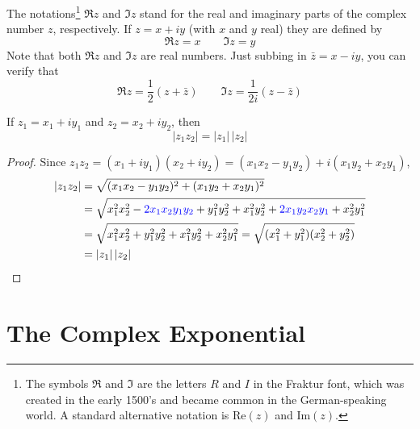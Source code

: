 \begin{defn}\label{def Re Im}
The notations\footnote{The symbols $\Re$ and $\Im$ are the letters $R$ and $I$
in the Fraktur font, which was created in the early 1500's and became common in the German-speaking world. A standard alternative notation is $\text{Re}(z)$ 
and $\text{Im}(z)$.} $\Re z$ and $\Im z$ stand for the real and imaginary parts 
of the complex number $z$, respectively. If $z=x+ iy$ (with $x$ and $y$ real) 
they are defined by 
\begin{equation*}
\Re z=x\qquad \Im z=y
\end{equation*}
Note that both $\Re z$ and $\Im z$ are real numbers.
Just subbing in  $\bar z=x-iy$, you can verify that
\begin{equation*}
\Re z=\frac{1}{2}(z+\bar z)\qquad \Im z=\frac{1}{2i}(z-\bar z)
\end{equation*}
\end{defn}
\begin{lemma}\label{lem mod prod}
If $z_1=x_1+iy_1$ and $z_2=x_2+iy_2$, then
\begin{equation*}
|z_1z_2| = |z_1|\,|z_2|
\end{equation*}
\end{lemma}
\begin{proof}
Since $z_1z_2=(x_1+iy_1)(x_2+iy_2)=(x_1x_2-y_1y_2)+i(x_1y_2+x_2y_1)$,
\begin{align*}
|z_1z_2| &=\sqrt{(x_1x_2-y_1y_2)^2+(x_1y_2+x_2y_1)^2} \\
 &=\sqrt{x_1^2x_2^2-\textcolor{blue}{2x_1x_2y_1y_2}+y_1^2y_2^2
+x_1^2y_2^2+\textcolor{blue}{2x_1y_2x_2y_1}+x_2^2y_1^2} \\
 &=\sqrt{x_1^2x_2^2+y_1^2y_2^2+x_1^2y_2^2+x_2^2y_1^2} 
=\sqrt{(x_1^2+y_1^2)(x_2^2+y_2^2)} \\
 &=|z_1|\,|z_2| 
\end{align*}
\end{proof}


\section{The Complex Exponential}\label{sec complex exp}
